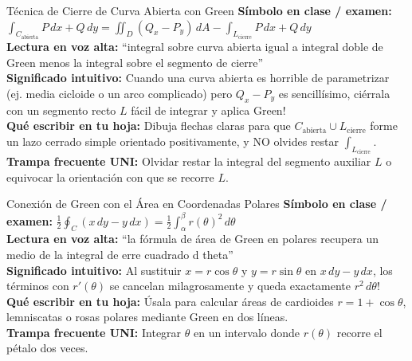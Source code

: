 \documentclass[11pt,a4paper]{article}
\begin{document}
\begin{definicionbox}{Técnica de Cierre de Curva Abierta con Green}
\textbf{Símbolo en clase / examen:} $\int_{C_{\text{abierta}}} P\,dx + Q\,dy = \iint_D (Q_x - P_y)\,dA - \int_{L_{\text{cierre}}} P\,dx + Q\,dy$\\[0.15cm]
\textbf{Lectura en voz alta:} ``integral sobre curva abierta igual a integral doble de Green menos la integral sobre el segmento de cierre''\\[0.12cm]
\textbf{Significado intuitivo:} Cuando una curva abierta es horrible de parametrizar (ej. media cicloide o un arco complicado) pero $Q_x - P_y$ es sencillísimo, ciérrala con un segmento recto $L$ fácil de integrar y aplica Green!\\[0.12cm]
\textbf{Qué escribir en tu hoja:} Dibuja flechas claras para que $C_{\text{abierta}} \cup L_{\text{cierre}}$ forme un lazo cerrado simple orientado positivamente, y NO olvides restar $\int_{L_{\text{cierre}}}$.\\[0.12cm]
\textbf{Trampa frecuente UNI:} Olvidar restar la integral del segmento auxiliar $L$ o equivocar la orientación con que se recorre $L$.
\end{definicionbox}

\begin{definicionbox}{Conexión de Green con el Área en Coordenadas Polares}
\textbf{Símbolo en clase / examen:} $\frac{1}{2}\oint_C (x\,dy - y\,dx) = \frac{1}{2}\int_\alpha^\beta r(\theta)^2\,d\theta$\\[0.15cm]
\textbf{Lectura en voz alta:} ``la fórmula de área de Green en polares recupera un medio de la integral de erre cuadrado d theta''\\[0.12cm]
\textbf{Significado intuitivo:} Al sustituir $x = r\cos\theta$ y $y = r\sin\theta$ en $x\,dy - y\,dx$, los términos con $r'(\theta)$ se cancelan milagrosamente y queda exactamente $r^2\,d\theta$!\\[0.12cm]
\textbf{Qué escribir en tu hoja:} Úsala para calcular áreas de cardioides $r = 1 + \cos\theta$, lemniscatas o rosas polares mediante Green en dos líneas.\\[0.12cm]
\textbf{Trampa frecuente UNI:} Integrar $\theta$ en un intervalo donde $r(\theta)$ recorre el pétalo dos veces.
\end{definicionbox}
\end{document}
